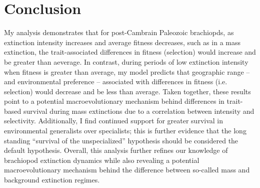 \documentclass[11pt]{article}
\begin{document}
\section*{Conclusion}

My analysis demonstrates that for post-Cambrain Paleozoic brachiopds, as extinction intensity increases and average fitness decreases, such as in a mass extinction, the trait-associated differences in fitness (selection) would increase and be greater than aeverage. In contrast, during periods of low extinction intensity when fitness is greater than average, my model predicts that geographic range -- and environmental preference -- associated with differences in fitness (i.e. selection) would decrease and be less than average. Taken together, these results point to a potential macroevolutionary mechanism behind differences in trait-based survival during mass extinctions due to a correlation between intensity and selectivity. Additionally, I find continued support for greater survival in environmental generalists over specialists; this is further evidence that the long standing ``survival of the unspecialized'' hypothesis \citep{Liow2004a,Liow2007b,Simpson1944,Simpson1953,Smits2015,Nurnberg2015,Nurnberg2013a, Baumiller1993} should be considered the default hypothesis. Overall, this analysis further refines our knowledge of brachiopod extinction dynamics while also revealing a potential macroevolutionary mechanism behind the difference between so-called mass and background extinction regimes.






\end{document}
